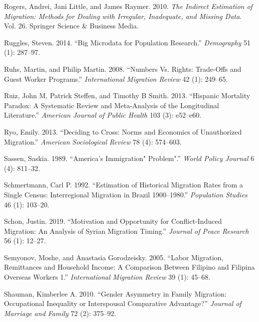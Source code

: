\documentclass[
]{article}
\begin{document}
\leavevmode\hypertarget{ref-rogers2010indirect}{}%
Rogers, Andrei, Jani Little, and James Raymer. 2010. \emph{The Indirect
Estimation of Migration: Methods for Dealing with Irregular, Inadequate,
and Missing Data}. Vol. 26. Springer Science \& Business Media.

\leavevmode\hypertarget{ref-ruggles2014big}{}%
Ruggles, Steven. 2014. ``Big Microdata for Population Research.''
\emph{Demography} 51 (1): 287--97.

\leavevmode\hypertarget{ref-ruhs2008numbers}{}%
Ruhs, Martin, and Philip Martin. 2008. ``Numbers Vs. Rights: Trade-Offs
and Guest Worker Programs.'' \emph{International Migration Review} 42
(1): 249--65.

\leavevmode\hypertarget{ref-ruiz2013hispanic}{}%
Ruiz, John M, Patrick Steffen, and Timothy B Smith. 2013. ``Hispanic
Mortality Paradox: A Systematic Review and Meta-Analysis of the
Longitudinal Literature.'' \emph{American Journal of Public Health} 103
(3): e52--e60.

\leavevmode\hypertarget{ref-ryo2013deciding}{}%
Ryo, Emily. 2013. ``Deciding to Cross: Norms and Economics of
Unauthorized Migration.'' \emph{American Sociological Review} 78 (4):
574--603.

\leavevmode\hypertarget{ref-sassen1989america}{}%
Sassen, Saskia. 1989. ``America's Immigration" Problem".'' \emph{World
Policy Journal} 6 (4): 811--32.

\leavevmode\hypertarget{ref-schmertmann1992estimation}{}%
Schmertmann, Carl P. 1992. ``Estimation of Historical Migration Rates
from a Single Census: Interregional Migration in Brazil 1900--1980.''
\emph{Population Studies} 46 (1): 103--20.

\leavevmode\hypertarget{ref-schon2019motivation}{}%
Schon, Justin. 2019. ``Motivation and Opportunity for Conflict-Induced
Migration: An Analysis of Syrian Migration Timing.'' \emph{Journal of
Peace Research} 56 (1): 12--27.

\leavevmode\hypertarget{ref-semyonov2005labor}{}%
Semyonov, Moshe, and Anastasia Gorodzeisky. 2005. ``Labor Migration,
Remittances and Household Income: A Comparison Between Filipino and
Filipina Overseas Workers 1.'' \emph{International Migration Review} 39
(1): 45--68.

\leavevmode\hypertarget{ref-shauman2010gender}{}%
Shauman, Kimberlee A. 2010. ``Gender Asymmetry in Family Migration:
Occupational Inequality or Interspousal Comparative Advantage?''
\emph{Journal of Marriage and Family} 72 (2): 375--92.
\end{document}
